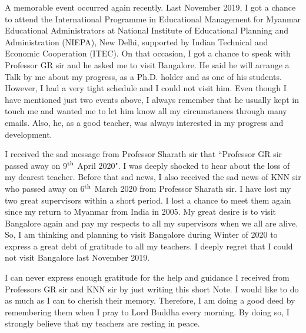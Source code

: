 A memorable event occurred again recently. Last November 2019, I got a chance to attend the International Programme in Educational Management for Myanmar Educational Administrators at National Institute of Educational Planning and Administration (NIEPA), New Delhi, supported by Indian Technical and Economic Cooperation (ITEC). On that occasion, I got a chance to speak with Professor GR sir and he asked me to visit Bangalore. He said he will arrange a Talk by me about my progress, as a Ph.D. holder and as one of his students. However, I had a very tight schedule and I could not visit him. Even though I have mentioned just two events above, I always remember that he usually kept in touch me and wanted me to let him know all my circumstances through many emails. Also, he, as a good teacher, was always interested in my progress and development. 

I received the sad message from Professor Sharath sir that ``Professor GR sir passed away on 9$^{\rm th}$ April 2020". I was deeply shocked to hear about the loss of my dearest teacher. Before that sad news, I also received the sad news of KNN sir who passed away on 6$^{\rm th}$ March 2020 from Professor Sharath sir. I have lost my two great supervisors within a short period. I lost a chance to meet them again since my return to Myanmar from India in 2005. My great desire is to visit Bangalore again and pay my respects to all my supervisors when we all are alive. So, I am thinking and planning to visit Bangalore during Winter of 2020 to express a great debt of gratitude to all my teachers. I deeply regret that I could not visit Bangalore last November 2019. 

I can never express enough gratitude for the help and guidance I received from Professors GR sir and KNN sir by just writing this short Note. I would like to do as much as I can to cherish their memory. Therefore, I am doing a good deed by remembering them when I pray to Lord Buddha every morning. By doing so, I strongly believe that my teachers are resting in peace. 
